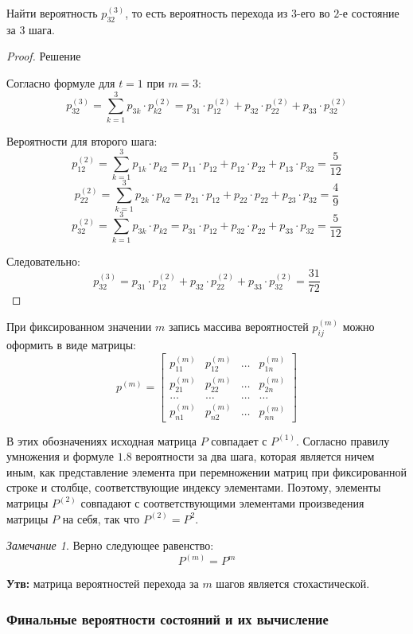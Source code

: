 \documentclass[aps,%
12pt,%
final,%
oneside,
onecolumn,%
musixtex, %
superscriptaddress,%
centertags]{article} %
\theoremstyle{plain}
\theoremstyle{definition}
\theoremstyle{remark}
\newtheorem{remark}{Замечание}[section]
\begin{document}
Найти вероятность $p_{32}^{(3)}$, то есть вероятность перехода из $3$-его во $2$-е состояние за $3$ шага.

\begin{proof}
	Решение

	Согласно формуле для $t=1$ при $m=3$:
	$$p_{32}^{(3)} = \sum\limits_{k=1}^3 p_{3k} \cdot p_{k2}^{(2)} = p_{31}\cdot p_{12}^{(2)} + p_{32}\cdot p_{22}^{(2)} + p_{33}\cdot p_{32}^{(2)}$$

	Вероятности для второго шага:
	$$p_{12}^{(2)} = \sum\limits_{k=1}^3 p_{1k} \cdot p_{k2} = p_{11}\cdot p_{12} + p_{12}\cdot p_{22} + p_{13}\cdot p_{32} = \frac{5}{12}$$
	$$p_{22}^{(2)} = \sum\limits_{k=1}^3 p_{2k} \cdot p_{k2} = p_{21}\cdot p_{12} + p_{22}\cdot p_{22} + p_{23}\cdot p_{32} = \frac{4}{9}$$
	$$p_{32}^{(2)} = \sum\limits_{k=1}^3 p_{3k} \cdot p_{k2} = p_{31}\cdot p_{12} + p_{32}\cdot p_{22} + p_{33}\cdot p_{32} = \frac{5}{12}$$

	Следовательно:
	$$p_{32}^{(3)} = p_{31}\cdot p_{12}^{(2)} + p_{32}\cdot p_{22}^{(2)} + p_{33}\cdot p_{32}^{(2)} = \frac{31}{72}$$
\end{proof}

При фиксированном значении $m$ запись массива вероятностей $p_{ij}^{(m)}$ можно оформить в виде матрицы:
$$p^{(m)} = \begin{bmatrix}
		p_{11}^{(m)} & p_{12}^{(m)} & \ldots & p_{1n}^{(m)} \\
		p_{21}^{(m)} & p_{22}^{(m)} & \ldots & p_{2n}^{(m)} \\
		\ldots & \ldots & \ldots & \ldots \\
		p_{n1}^{(m)} & p_{n2}^{(m)} & \ldots & p_{nn}^{(m)}
	\end{bmatrix}$$

В этих обозначениях исходная матрица $P$ совпадает с $P^{(1)}$. Согласно правилу умножения и формуле $1.8$ вероятности за два шага, которая является ничем иным, как представление элемента при перемножении матриц при фиксированной строке и столбце, соответствующие индексу элементами. Поэтому, элементы матрицы $P^{(2)}$ совпадают с соответствующими элементами произведения матрицы $P$ на себя, так что $P^{(2)} = P^2$. 

\begin{remark}
	Верно следующее равенство:
	$$P^{(m)} = P^m$$
\end{remark}

\textbf{Утв:} матрица вероятностей перехода за $m$ шагов является стохастической.

\subsubsection{Финальные вероятности состояний и их вычисление}
\end{document}
